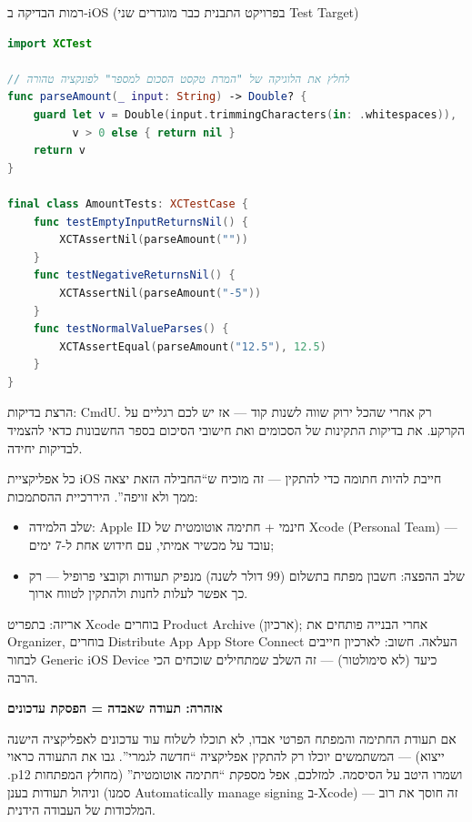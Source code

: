 \begin{center}\small\color{gray}רמות הבדיקה ב-iOS (בפרויקט התבנית כבר מוגדרים שני Test Target)\end{center}

\begin{lstlisting}[language=Swift]
import XCTest

// לחלץ את הלוגיקה של "המרת טקסט הסכום למספר" לפונקציה טהורה
func parseAmount(_ input: String) -> Double? {
    guard let v = Double(input.trimmingCharacters(in: .whitespaces)),
          v > 0 else { return nil }
    return v
}

final class AmountTests: XCTestCase {
    func testEmptyInputReturnsNil() {
        XCTAssertNil(parseAmount(""))
    }
    func testNegativeReturnsNil() {
        XCTAssertNil(parseAmount("-5"))
    }
    func testNormalValueParses() {
        XCTAssertEqual(parseAmount("12.5"), 12.5)
    }
}
\end{lstlisting}

הרצת בדיקות: CmdU. רק אחרי שהכל ירוק שווה לשנות קוד — אז יש לכם רגליים על הקרקע. את בדיקות התקינות של הסכומים ואת חישובי הסיכום בספר החשבונות כדאי להצמיד לבדיקות יחידה.


כל אפליקציית iOS חייבת להיות חתומה כדי להתקין — זה מוכיח ש“החבילה הזאת יצאה ממך ולא זויפה”. היררכיית ההסתמכות:

\begin{itemize}
  \item שלב הלמידה: Apple ID חינמי + חתימה אוטומטית של Xcode (Personal Team) — עובד על מכשיר אמיתי, עם חידוש אחת ל-7 ימים;
  \item שלב ההפצה: חשבון מפתח בתשלום (99 דולר לשנה) מנפיק תעודות וקובצי פרופיל — רק כך אפשר לעלות לחנות ולהתקין לטווח ארוך.
\end{itemize}

אריזה: בתפריט Xcode בוחרים Product Archive (ארכיון); אחרי הבנייה פותחים את Organizer, בוחרים Distribute App App Store Connect העלאה. חשוב: לארכיון חייבים לבחור Generic iOS Device כיעד (לא סימולטור) — זה השלב שמתחילים שוכחים הכי הרבה.

\textbf{אזהרה: תעודה שאבדה = הפסקת עדכונים}\par

אם תעודת החתימה והמפתח הפרטי אבדו, לא תוכלו לשלוח עוד עדכונים לאפליקציה הישנה — המשתמשים יוכלו רק להתקין אפליקציה “חדשה לגמרי”. גבו את התעודה כראוי (ייצוא .p12 מחולץ המפתחות) ושמרו היטב על הסיסמה. למזלכם, אפל מספקת “חתימה אוטומטית” וניהול תעודות בענן (סמנו Automatically manage signing ב-Xcode) — זה חוסך את רוב המלכודות של העבודה הידנית.

